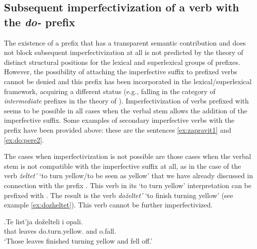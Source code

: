 \subsection{Subsequent imperfectivization of a verb with the \textit{do-} prefix}
The existence of a prefix that has a transparent semantic contribution and does not block subsequent imperfectivization at all is not predicted by the theory of distinct structural positions for the lexical and superlexical groups of prefixes. However, the possibility of attaching the imperfective suffix to prefixed verbs cannot be denied and this prefix has been incorporated in the lexical/superlexical framework, acquiring a different status (e.g., falling in the category of \textit{intermediate} prefixes in the theory of \citealt{Tatevosov:07}). Imperfectivization of verbs prefixed with  seems to be possible in all cases when the verbal stem allows the addition of the imperfective suffix. Some examples of secondary imperfective verbs with the prefix  have been provided above: these are the sentences \ref{ex:zapravit1} and \ref{ex:do:pere2}.

The cases when imperfectivization is not possible are those cases when the verbal stem is not compatible with the imperfective suffix at all, as in the case of the verb \textit{\v{z}eltet'} `to turn yellow/to be seen as yellow' that we have already discussed in connection with the prefix . This verb in its `to turn yellow' interpretation can be prefixed with . The result is the verb \textit{do\v{z}eltet'} `to finish turning yellow' (see example \ref{ex:dozheltet}). This verb cannot be further imperfectivized. 

\exg.\label{ex:dozheltet}Te list'ja do\v{z}elteli i opali.\\
that leaves do.turn.yellow. and o.fall.\\
\trans `Those leaves finished turning yellow and fell off.'\\


